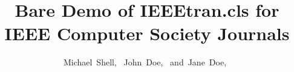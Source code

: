 \documentclass[10pt,journal,compsoc]{IEEEtran}
\begin{document}
%
\title{Bare Demo of IEEEtran.cls for\\ IEEE Computer Society Journals}
%
%
%
%

\author{Michael~Shell,~
        John~Doe,~
        and~Jane~Doe,~%
}
\end{document}
